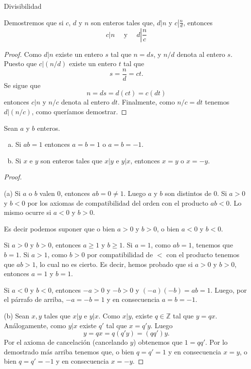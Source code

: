 \begin{section}{Divisibilidad}
\begin{ejemplo} Demostremos que si $c$, $d$ y $n$ son enteros tales
que, $d|n$ y $c\left|\frac{n}{d}\right.$, entonces
$$ c|n \quad\text{ y }\quad d\left|\frac{n}{c}\right.$$
\end{ejemplo}
\begin{proof} Como $d|n$ existe un entero $s$ tal que $n=ds$, y
$n/d$ denota al entero $s$. Puesto que $c|(n/d)$ existe un entero
$t$ tal que
$$s=\frac{n}{d} =ct.
$$
Se sigue que
$$
n=ds=d(ct)=c(dt)$$
 entonces $c|n$ y $n/c$ denota al entero $dt$. Finalmente, como
$n/c=dt$ tenemos $d|(n/c)$, como queríamos demostrar.
\end{proof}

\begin{proposicion}\label{pm} Sean $a$ y $b$ enteros.
\begin{enumerate}[a)]
\item Si  $ab=1$ entonces $a=b=1$ o $a=b=-1$. 
\item \label{prop-pm-b}Si $x$ e $y$ son enteros tales que $x|y$ e $y|x$, entonces $x=y$ o $x=-y$.
\end{enumerate}
\end{proposicion}
\begin{proof}
\

\noindent (a) Si $a$ o $b$ valen $0$, entonces $ab=0 \not=1$. Luego $a$ y $b$ son distintos de $0$. Si $a>0$ y $b<0$ por los axiomas de compatibilidad del orden con el producto $ab<0$. Lo mismo ocurre si $a<0$ y $b>0$.

Es decir podemos suponer que o bien $a>0$ y $b>0$, o bien $a<0$ y $b<0$. 

Si  $a>0$ y $b>0$, entonces  $a\ge 1$ y $b\ge 1$. Si $a=1$, como $ab =1$, tenemos que $b = 1$. Si $a>1$, como  $b>0$ por compatibilidad de $<$ con el producto tenemos que $ab>1$, lo cual no es cierto. Es decir, hemos probado que si  $a>0$ y $b>0$, entonces $a=1$ y $b=1$.

Si  $a<0$ y $b<0$, entonces   $-a>0$ y $-b>0$ y $(-a)(-b) = ab =1$. Luego, por el párrafo de arriba, $-a=-b=1$ y en consecuencia $a=b=-1$.


\noindent (b) Sean $x,y$ tales que  $x|y$ e $y|x$. Como $x|y$, existe $q \in \mathbb Z$ tal que $y = qx$. Análogamente, como $y|x$ existe $q'$ tal que $x = q'y$. Luego
$$y = qx = q(q'y) = (qq')y.$$
Por el axioma de cancelación (cancelando $y$) obtenemos que $1 = qq'$. Por lo demostrado más arriba tenemos que, o bien $q=q'=1$ y en consecuencia $x=y$, o bien $q=q'=-1$ y en consecuencia $x=-y$. 
\end{proof}


\end{section}
